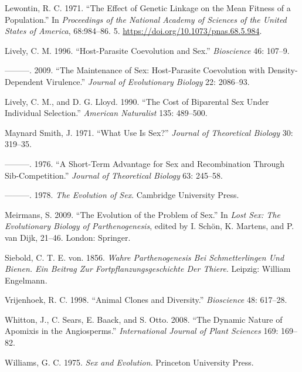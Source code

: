 \documentclass[
  letterpaper,
]{book}
\newlength{\cslhangindent}
\newlength{\cslentryspacingunit} %
\newenvironment{CSLReferences}[2] %
 {%
  \setlength{\parindent}{0pt}
  \ifodd #1
  \let\oldpar\par
  \def\par{\hangindent=\cslhangindent\oldpar}
  \fi
  \setlength{\parskip}{#2\cslentryspacingunit}
 }%
 {}
\begin{document}
\begin{CSLReferences}{1}{0}
\leavevmode{}%
Lewontin, R. C. 1971. {``The Effect of Genetic Linkage on the Mean
Fitness of a Population.''} In \emph{Proceedings of the National Academy
of Sciences of the United States of America}, 68:984--86. 5.
\url{https://doi.org/10.1073/pnas.68.5.984}.

\leavevmode{}%
Lively, C. M. 1996. {``Host-Parasite Coevolution and Sex.''}
\emph{Bioscience} 46: 107--9.

\leavevmode{}%
---------. 2009. {``The Maintenance of Sex: Host-Parasite Coevolution
with Density-Dependent Virulence.''} \emph{Journal of Evolutionary
Biology} 22: 2086--93.

\leavevmode{}%
Lively, C. M., and D. G. Lloyd. 1990. {``The Cost of Biparental Sex
Under Individual Selection.''} \emph{American Naturalist} 135: 489--500.

\leavevmode{}%
Maynard Smith, J. 1971. {``What Use Is Sex?''} \emph{Journal of
Theoretical Biology} 30: 319--35.

\leavevmode{}%
---------. 1976. {``A Short-Term Advantage for Sex and Recombination
Through Sib-Competition.''} \emph{Journal of Theoretical Biology} 63:
245--58.

\leavevmode{}%
---------. 1978. \emph{The Evolution of Sex}. Cambridge University
Press.

\leavevmode{}%
Meirmans, S. 2009. {``The Evolution of the Problem of Sex.''} In
\emph{Lost Sex: The Evolutionary Biology of Parthenogenesis}, edited by
I. Schön, K. Martens, and P. van Dijk, 21--46. London: Springer.

\leavevmode{}%
Siebold, C. T. E. von. 1856. \emph{Wahre Parthenogenesis Bei
Schmetterlingen Und Bienen. Ein Beitrag Zur Fortpflanzungsgeschichte Der
Thiere}. Leipzig: William Engelmann.

\leavevmode{}%
Vrijenhoek, R. C. 1998. {``Animal Clones and Diversity.''}
\emph{Bioscience} 48: 617--28.

\leavevmode{}%
Whitton, J., C. Sears, E. Baack, and S. Otto. 2008. {``The Dynamic
Nature of Apomixis in the Angiosperms.''} \emph{International Journal of
Plant Sciences} 169: 169--82.

\leavevmode{}%
Williams, G. C. 1975. \emph{Sex and Evolution}. Princeton University
Press.

\end{CSLReferences}


\backmatter
\end{document}
